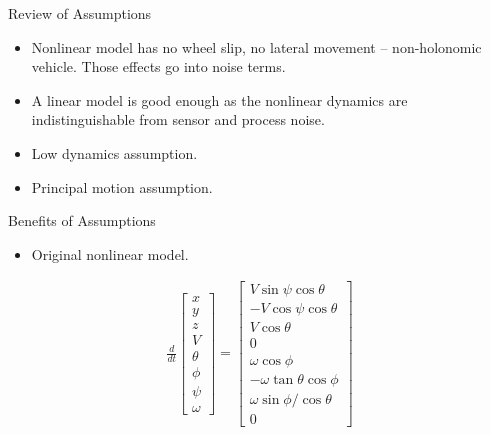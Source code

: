 \documentclass[hyperref={pdfpagelabels=false}]{beamer}
\begin{document}
\begin{frame}{Review of Assumptions}
\begin{itemize}
\item Nonlinear model has no wheel slip, no lateral movement -- non-holonomic vehicle. Those effects go into noise terms.
\item A linear model is good enough as the nonlinear dynamics are indistinguishable from sensor and process noise.
\item Low dynamics assumption.
\item Principal motion assumption.
\end{itemize}
\end{frame}

\begin{frame}{Benefits of Assumptions}
\begin{itemize}
\item Original nonlinear model.
\end{itemize}
\begin{align*}
\frac{d}{dt}\left[\begin{array}{c}
x \\ y \\ z \\ V \\ \theta \\ \phi \\ \psi \\ \omega
\end{array}\right] =
\left[\begin{array}{c}
V\sin\psi\cos\theta \\
-V\cos\psi\cos\theta \\
V\cos\theta \\
0 \\
\omega\cos\phi \\
-\omega\tan\theta\cos\phi \\
\omega\sin\phi/\cos\theta \\
0
\end{array}\right]
\end{align*}
\end{frame}
\end{document}
